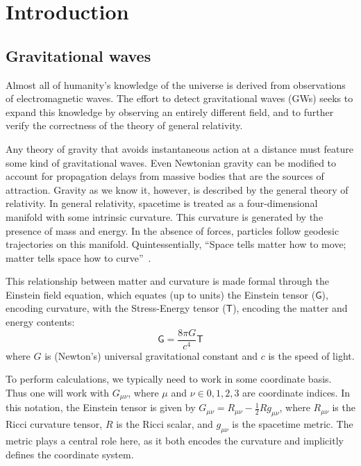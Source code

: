 \chapter{Introduction}
\label{chapter1}

\section{Gravitational waves}

Almost all of humanity's knowledge of the universe is derived from
observations of electromagnetic waves.  The effort to detect
gravitational waves (GWs) seeks to expand this knowledge by observing an
entirely different field, and to further verify the correctness of the
theory of general relativity.

Any theory of gravity that avoids instantaneous action at a distance
must feature some kind of gravitational waves.  Even Newtonian gravity
can be modified to account for propagation delays from massive bodies
that are the sources of attraction\cite{Schutz1984Gravitational}.
Gravity as we know it, however, is described by the general theory of
relativity.  In general relativity, spacetime is treated as a
four-dimensional manifold with some intrinsic curvature.  This
curvature is generated by the presence of mass and energy.  In the
absence of forces, particles follow geodesic trajectories on this
manifold.  Quintessentially, ``Space tells matter how to move; matter
tells space how to curve''~\cite{MTW}.

This relationship between matter and curvature is made formal through
the Einstein field equation, which equates (up to units) the Einstein
tensor ($\mathsf{G}$), encoding curvature, with the
Stress-Energy tensor ($\mathsf{T}$), encoding the matter and energy
contents:
\begin{equation}
\mathsf{G} = \frac {8\pi G}{c^4} \mathsf{T}
\end{equation}
where $G$ is (Newton's) universal gravitational constant and $c$ is
the speed of light.

To perform calculations, we typically need to work in some coordinate
basis.  Thus one will work with $G_{\mu\nu}$, where $\mu$ and $\nu \in
{0,1,2,3}$ are coordinate indices.  In this notation, the Einstein
tensor is given by $G_{\mu\nu} = R_{\mu\nu} - \frac{1}{2} R
g_{\mu\nu}$, where $R_{\mu\nu}$ is the Ricci curvature tensor, $R$ is
the Ricci scalar, and $g_{\mu\nu}$ is the spacetime metric.  The
metric plays a central role here, as it both encodes the curvature and
implicitly defines the coordinate system.

